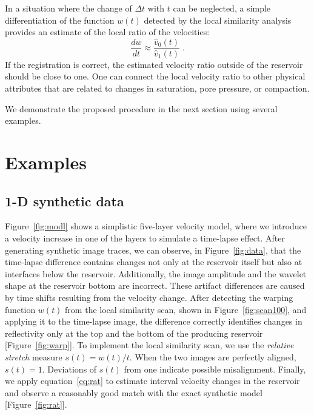 In a situation where the change of $\Delta t$ with $t$ can be neglected,
 a simple differentiation of the function
$w(t)$ detected by the local similarity analysis provides an estimate
of the local ratio of the velocities:
\begin{equation}
{\frac{d w}{d t}} \approx {\frac{\hat{v}_0(t)}{\hat{v}_1(t)}}\;.
\label{eq:rat}
\end{equation}
If the registration is correct, the estimated velocity ratio outside
of the reservoir should be close to one. One can connect
the local velocity ratio to other physical attributes that are
related to changes in saturation, pore pressure, or compaction.

We demonstrate the proposed procedure in the next section using several
 examples.

\section{Examples}

\subsection{1-D synthetic data}


 Figure~\ref{fig:modl} shows a simplistic five-layer velocity model,
 where we introduce a velocity increase in one of the layers to
 simulate a time-lapse effect. After generating synthetic image
 traces, we can observe, in Figure~\ref{fig:data}, that the time-lapse
 difference contains changes not only at the reservoir itself but also
 at interfaces below the reservoir. Additionally, the image amplitude
 and the wavelet shape at the reservoir bottom are incorrect.  These
 artifact differences are caused by time shifts resulting from the
 velocity change. After detecting the warping function $w(t)$ from the
 local similarity scan, shown in Figure~\ref{fig:scan100}, and
 applying it to the time-lapse image, the difference correctly
 identifies changes in reflectivity only at the top and the bottom of
 the producing reservoir [Figure~\ref{fig:warp}]. To implement the
 local similarity scan, we use the \emph{relative stretch} measure
 $s(t) = w(t)/t$. When the two images are perfectly aligned,
 $s(t)=1$. Deviations of $s(t)$ from one indicate possible
 misalignment. Finally, we apply equation~\ref{eq:rat} to estimate
 interval velocity changes in the reservoir and observe a reasonably
 good match with the exact synthetic model [Figure~\ref{fig:rat}].

